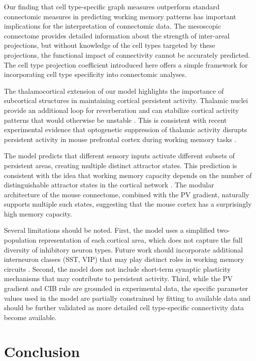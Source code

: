 \documentclass[11pt]{article}
\begin{document}
Our finding that cell type-specific graph measures outperform standard connectomic measures in predicting working memory patterns has important implications for the interpretation of connectomic data. The mesoscopic connectome provides detailed information about the strength of inter-areal projections, but without knowledge of the cell types targeted by these projections, the functional impact of connectivity cannot be accurately predicted. The cell type projection coefficient introduced here offers a simple framework for incorporating cell type specificity into connectomic analyses.

The thalamocortical extension of our model highlights the importance of subcortical structures in maintaining cortical persistent activity. Thalamic nuclei provide an additional loop for reverberation and can stabilize cortical activity patterns that would otherwise be unstable \citep{guo2017,bolkan2017}. This is consistent with recent experimental evidence that optogenetic suppression of thalamic activity disrupts persistent activity in mouse prefrontal cortex during working memory tasks \citep{schmitt2017}.

The model predicts that different sensory inputs activate different subsets of persistent areas, creating multiple distinct attractor states. This prediction is consistent with the idea that working memory capacity depends on the number of distinguishable attractor states in the cortical network \citep{compte2000}. The modular architecture of the mouse connectome, combined with the PV gradient, naturally supports multiple such states, suggesting that the mouse cortex has a surprisingly high memory capacity.

Several limitations should be noted. First, the model uses a simplified two-population representation of each cortical area, which does not capture the full diversity of inhibitory neuron types. Future work should incorporate additional interneuron classes (SST, VIP) that may play distinct roles in working memory circuits \citep{pinto2013}. Second, the model does not include short-term synaptic plasticity mechanisms that may contribute to persistent activity. Third, while the PV gradient and CIB rule are grounded in experimental data, the specific parameter values used in the model are partially constrained by fitting to available data and should be further validated as more detailed cell type-specific connectivity data become available.

\section{Conclusion}
\end{document}
